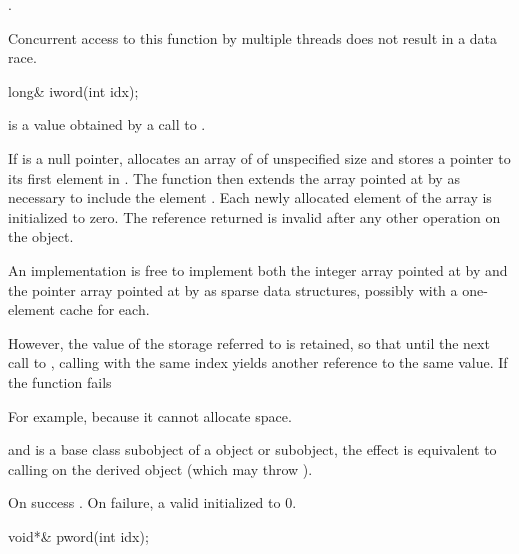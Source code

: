 \begin{itemdescr}
\pnum
\returns
{}
\tcode{++}.

\pnum
\remarks
Concurrent access to this function by multiple threads does not result in a data
race.
\end{itemdescr}

%
\begin{itemdecl}
long& iword(int idx);
\end{itemdecl}

\begin{itemdescr}
\pnum
\expects
{} is a value obtained by a call to .

\pnum
\effects
If  is a null pointer, allocates an array of
of unspecified size and stores a pointer to its first element in
.
The function then extends the array pointed at by
 as necessary to include the element
.
Each newly allocated element of the array is initialized to zero.
The reference returned is invalid after any other operation on the
object.
\begin{footnote}
An implementation is free to implement both the integer
array pointed at by  and the pointer array pointed at by
 as sparse data structures, possibly with a one-element
cache for each.
\end{footnote}
However, the value of the storage referred to is retained, so
that until the next call to
,
calling
with the same index yields another reference to the same value.
If the function fails
\begin{footnote}
For example, because it cannot allocate space.
\end{footnote}
and
is a base class subobject of a
object or subobject, the effect is equivalent to calling
on the derived object (which may throw
).

\pnum
\returns
On success
.
On failure, a valid
initialized to 0.
\end{itemdescr}

%
\begin{itemdecl}
void*& pword(int idx);
\end{itemdecl}

